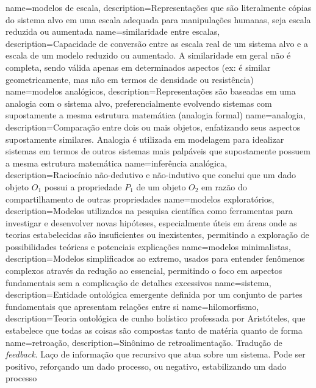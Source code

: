 {
    name=modelos de escala,
    description={Representações que são literalmente cópias do sistema alvo em uma escala adequada para manipulações humanas, seja escala reduzida ou aumentada}
}
{
    name=similaridade entre escalas,
    description={Capacidade de conversão entre as escala real de um sistema alvo e a escala de um modelo reduzido ou aumentado. A similaridade em geral não é completa, sendo válida apenas em determinados aspectos (ex: é similar geometricamente, mas não em termos de densidade ou resistência)}
}
{
    name=modelos analógicos,
    description={Representações são baseadas em uma analogia com o sistema alvo, preferencialmente evolvendo sistemas com supostamente a mesma estrutura matemática (analogia formal)}
}
{
    name=analogia,
    description={Comparação entre dois ou mais objetos, enfatizando seus aspectos supostamente similares. Analogia é utilizada em modelagem para idealizar sistemas em termos de outros sistemas mais palpáveis que supostamente possuem a mesma estrutura matemática}
}
{
    name=inferência analógica,
    description={Raciocínio não-dedutivo e não-indutivo que conclui que um dado objeto $O_1$ possui a propriedade $P_1$ de um objeto $O_2$ em razão do compartilhamento de outras propriedades}
}
{
    name=modelos exploratórios,
    description={Modelos utilizados na pesquisa científica como ferramentas para investigar e desenvolver novas hipóteses, especialmente úteis em áreas onde as teorias estabelecidas são insuficientes ou inexistentes, permitindo a exploração de possibilidades teóricas e potenciais explicações}
}
{
    name=modelos minimalistas,
    description={Modelos simplificados ao extremo, usados para entender fenômenos complexos através da redução ao essencial, permitindo o foco em aspectos fundamentais sem a complicação de detalhes excessivos}
}
{
    name=sistema,
    description={Entidade ontológica emergente definida por um conjunto de partes fundamentais que apresentam relações entre si}
}
{
    name=hilomorfismo,
    description={Teoria ontológica de cunho holístico professada por Aristóteles, que estabelece que todas as coisas são compostas tanto de matéria quanto de forma}
}
{
    name=retroação,
    description={Sinônimo de retroalimentação. Tradução de \textit{feedback}. Laço de informação que recursivo que atua sobre um sistema. Pode ser positivo, reforçando um dado processo, ou negativo, estabilizando um dado processo}
}
